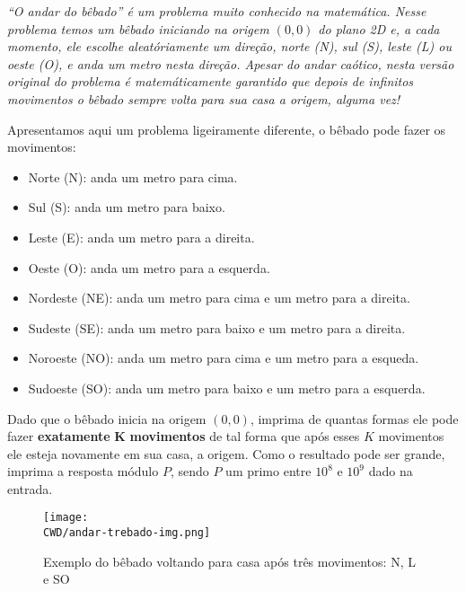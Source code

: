 %
\textit{“O andar do bêbado” é um problema muito conhecido na matemática. Nesse problema temos um bêbado iniciando na origem $(0, 0)$ do plano 2D e, a cada momento, ele escolhe aleatóriamente um direção, norte (N), sul (S), leste (L) ou oeste (O), e anda um metro nesta direção. Apesar do andar caótico, nesta versão original do problema é matemáticamente garantido que depois de infinitos movimentos o bêbado sempre volta para sua casa a origem, alguma vez!}

Apresentamos aqui um problema ligeiramente diferente, o bêbado pode fazer os movimentos:
\begin{itemize}
    \item Norte (N): anda um metro para cima.
    \item Sul (S): anda um metro para baixo.
    \item Leste (E): anda um metro para a direita.
    \item Oeste (O): anda um metro para a esquerda.
    \item Nordeste (NE): anda um metro para cima e um metro para a direita.
    \item Sudeste (SE): anda um metro para baixo e um metro para a direita.
    \item Noroeste (NO): anda um metro para cima e um metro para a esqueda.
    \item Sudoeste (SO): anda um metro para baixo e um metro para a esquerda.
\end{itemize}

Dado que o bêbado inicia na origem $(0, 0)$, imprima de quantas formas ele pode fazer \textbf{exatamente} $\boldsymbol K$ \textbf{movimentos} de tal forma que após esses $K$ movimentos ele esteja novamente em sua casa, a origem. Como o resultado pode ser grande, imprima a resposta módulo $P$, sendo $P$ um primo entre $10^8$ e $10^9$ dado na entrada.

\begin{figure}[H]
    \centering
    \texttt{[image: \\CWD/andar-trebado-img.png]}
    \caption{Exemplo do bêbado voltando para casa após três movimentos: N, L e SO}
\end{figure}

%

